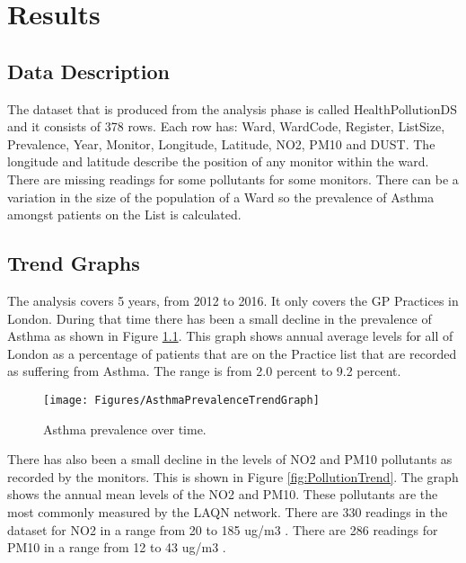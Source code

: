 
\chapter{Results} %

\label{Chapter5} %




\section{Data Description}
The dataset that is produced from the analysis phase is called HealthPollutionDS and it consists of 378 rows. Each row has: Ward, WardCode, Register, ListSize, Prevalence, Year, Monitor, Longitude, Latitude, NO2, PM10 and DUST. The longitude and latitude describe the position of any monitor within the ward. There are missing readings for some pollutants for some monitors. There can be a variation in the size of the population of a Ward so the prevalence of Asthma amongst patients on the List is calculated.




\section{Trend Graphs}
The analysis covers 5 years, from 2012 to 2016. It only covers the GP Practices in London. During that time there has been a small decline in the prevalence of Asthma as shown in Figure \ref{fig:AsthmaPrevalence}. This graph shows annual average levels for all of London as a percentage of patients that are on the Practice list that are recorded as suffering from Asthma. The range is from 2.0 percent to 9.2 percent.

\begin{figure}
\centering
\texttt{[image: Figures/AsthmaPrevalenceTrendGraph]}
\decoRule
\caption[Asthma Prevalence]{Asthma prevalence over time.}
\label{fig:AsthmaPrevalence}
\end{figure}



There has also been a small decline in the levels of NO2 and PM10 pollutants as recorded by the monitors. This is shown in Figure \ref{fig:PollutionTrend}.
The graph shows the annual mean levels of the NO2 and PM10. These pollutants are the most commonly measured by the LAQN network. There are 330 readings in the dataset for NO2 in a range from 20 to 185 ug/m3 . There are 286 readings for PM10 in a range from 12 to 43 ug/m3 .


